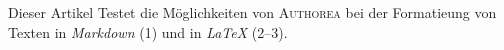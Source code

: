 Dieser Artikel Testet die Möglichkeiten von \textsc{Authorea} bei der Formatieung von Texten in \emph{Markdown} (1) und in \emph{LaTeX} (2–3).

